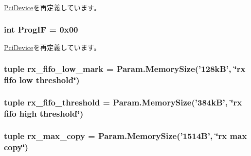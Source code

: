 \hyperlink{classPci_1_1PciDevice_a00f14447f8246b8b6a86c550185caddc}{PciDevice}を再定義しています。\hypertarget{classEthernet_1_1Sinic_aa63e82532e33e89795f472cfb7e0bb67}{
\subsubsection[{ProgIF}]{\setlength{\rightskip}{0pt plus 5cm}int {\bf ProgIF} = 0x00}}
\label{classEthernet_1_1Sinic_aa63e82532e33e89795f472cfb7e0bb67}


\hyperlink{classPci_1_1PciDevice_ae1b2d8ef2a839fabf99be35121a8b6e8}{PciDevice}を再定義しています。\hypertarget{classEthernet_1_1Sinic_ad5c33d5cf217b74a898883107ce39b38}{
\subsubsection[{rx\_\-fifo\_\-low\_\-mark}]{\setlength{\rightskip}{0pt plus 5cm}tuple {\bf rx\_\-fifo\_\-low\_\-mark} = Param.MemorySize('128kB', \char`\"{}rx fifo low threshold\char`\"{})}}
\label{classEthernet_1_1Sinic_ad5c33d5cf217b74a898883107ce39b38}
\hypertarget{classEthernet_1_1Sinic_a23dbf25bafd73410ce88b10151d564cb}{
\subsubsection[{rx\_\-fifo\_\-threshold}]{\setlength{\rightskip}{0pt plus 5cm}tuple {\bf rx\_\-fifo\_\-threshold} = Param.MemorySize('384kB', \char`\"{}rx fifo high threshold\char`\"{})}}
\label{classEthernet_1_1Sinic_a23dbf25bafd73410ce88b10151d564cb}
\hypertarget{classEthernet_1_1Sinic_ab20f207dc9ec8ac2c424b651a3db2d22}{
\subsubsection[{rx\_\-max\_\-copy}]{\setlength{\rightskip}{0pt plus 5cm}tuple {\bf rx\_\-max\_\-copy} = Param.MemorySize('1514B', \char`\"{}rx max copy\char`\"{})}}

